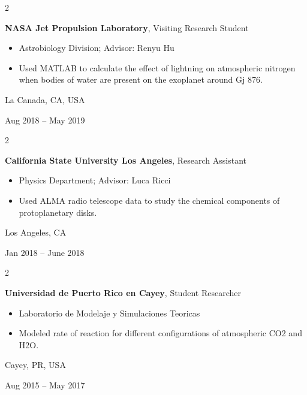 \documentclass[10pt, letterpaper]{article}
\newenvironment{highlights}{
    \begin{itemize}[
        topsep=0.10 cm,
        parsep=0.10 cm,
        partopsep=0pt,
        itemsep=0pt,
        leftmargin=0.4 cm + 10pt
    ]
}{
    \end{itemize}
} %
\newenvironment{twocolentry}[2][]{
    \onecolentry
    \def\secondColumn{#2}
    \setcolumnwidth{\fill, 4.5 cm}
    \begin{paracol}{2}
}{
    \switchcolumn \raggedleft \secondColumn
    \end{paracol}
    \endonecolentry
} %
\begin{document}
        \vspace{0.2 cm}

        \begin{twocolentry}{
            La Canada, CA, USA

        Aug 2018 – May 2019
        }
            \textbf{NASA Jet Propulsion Laboratory}, Visiting Research Student
            \begin{highlights}
                \item Astrobiology Division; Advisor: Renyu Hu
                \item Used MATLAB to calculate the effect of lightning on atmospheric nitrogen when bodies of water are present on the exoplanet around Gj 876.
            \end{highlights}
        \end{twocolentry}


        \vspace{0.2 cm}

        \begin{twocolentry}{
            Los Angeles, CA

        Jan 2018 – June 2018
        }
            \textbf{California State University Los Angeles}, Research Assistant
            \begin{highlights}
                \item Physics Department; Advisor: Luca Ricci
                \item Used ALMA radio telescope data to study the chemical components of protoplanetary disks.
            \end{highlights}
        \end{twocolentry}


        \vspace{0.2 cm}

        \begin{twocolentry}{
            Cayey, PR, USA

        Aug 2015 – May 2017
        }
            \textbf{Universidad de Puerto Rico en Cayey}, Student Researcher
            \begin{highlights}
                \item Laboratorio de Modelaje y Simulaciones Teoricas
                \item Modeled rate of reaction for different configurations of atmospheric CO2 and H2O.
            \end{highlights}
        \end{twocolentry}
\end{document}
